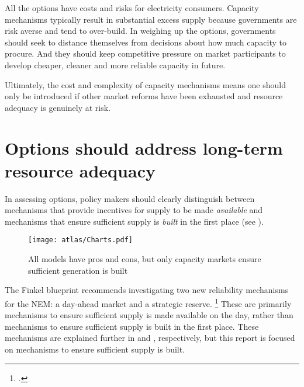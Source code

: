 \documentclass[FrontPage]{grattan}
\begin{document}
All the options have costs and risks for electricity consumers. Capacity mechanisms typically result in substantial excess supply because governments are risk averse and tend to over-build. In weighing up the options, governments should seek to distance themselves from decisions about how much capacity to procure. And they should keep competitive pressure on market participants to develop cheaper, cleaner and more reliable capacity in future.

Ultimately, the cost and complexity of capacity mechanisms means one should only be introduced if other market reforms have been exhausted and resource adequacy is genuinely at risk.

\section{Options should address long-term resource adequacy}\label{sec:options-should-address-long-term-resource-adequacy}
In assessing options, policy makers should clearly distinguish between mechanisms that provide incentives for supply to be made \emph{available} and mechanisms that ensure sufficient supply is \emph{built} in the first place (see ). 

\begin{figure}
\caption{All models have pros and cons, but only capacity markets ensure sufficient generation is built}\label{fig:all-models-have-pros-and-cons-only-two-ensure-sufficient-generation-is-built}
\units{}
\texttt{[image: atlas/Charts.pdf]}
\end{figure}

The Finkel blueprint recommends investigating two new reliability mechanisms for the NEM: a day-ahead market and a strategic reserve.%
\footcite[100][103]{Finkel2017ReviewFinal}
These are primarily mechanisms to ensure sufficient supply is made available on the day, rather than mechanisms to ensure sufficient supply is built in the first place. These mechanisms are explained further in  and , respectively, but this report is focused on mechanisms to ensure sufficient supply is built.
\end{document}
